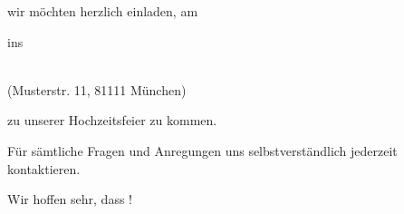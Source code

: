 %
\vfil 
\noindent wir m\"ochten  herzlich einladen, am

\begin{center}
    \selectfont{} 
\end{center}
ins
\begin{center}
    \selectfont{}\\
    (Musterstr. 11, 81111 M\"unchen)
\end{center}

\noindent zu unserer Hochzeitsfeier zu kommen. 


\vfill{}
\noindent
F\"ur s\"amtliche Fragen und Anregungen  uns selbstverst\"andlich jederzeit kontaktieren.  

\vfill

\raggedright
Wir hoffen sehr, dass ! \RowSepVar{4ex}

\vfill 
